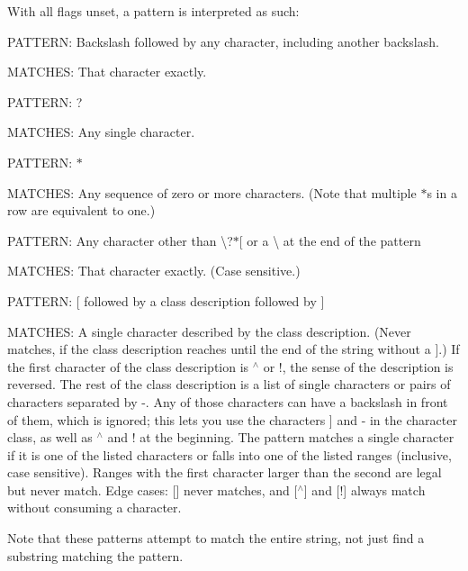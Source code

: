 With all flags unset, a pattern is interpreted as such\-:

P\-A\-T\-T\-E\-R\-N\-: Backslash followed by any character, including another backslash.\par
 M\-A\-T\-C\-H\-E\-S\-: That character exactly.

P\-A\-T\-T\-E\-R\-N\-: ?\par
 M\-A\-T\-C\-H\-E\-S\-: Any single character. 

P\-A\-T\-T\-E\-R\-N\-: $\ast$\par
 M\-A\-T\-C\-H\-E\-S\-: Any sequence of zero or more characters. (Note that multiple $\ast$s in a row are equivalent to one.)

P\-A\-T\-T\-E\-R\-N\-: Any character other than \textbackslash{}?$\ast$\mbox{[} or a \textbackslash{} at the end of the pattern\par
 M\-A\-T\-C\-H\-E\-S\-: That character exactly. (Case sensitive.)

P\-A\-T\-T\-E\-R\-N\-: \mbox{[} followed by a class description followed by \mbox{]}\par
 M\-A\-T\-C\-H\-E\-S\-: A single character described by the class description. (Never matches, if the class description reaches until the end of the string without a \mbox{]}.) If the first character of the class description is $^\wedge$ or !, the sense of the description is reversed. The rest of the class description is a list of single characters or pairs of characters separated by -\/. Any of those characters can have a backslash in front of them, which is ignored; this lets you use the characters \mbox{]} and -\/ in the character class, as well as $^\wedge$ and ! at the beginning. The pattern matches a single character if it is one of the listed characters or falls into one of the listed ranges (inclusive, case sensitive). Ranges with the first character larger than the second are legal but never match. Edge cases\-: \mbox{[}\mbox{]} never matches, and \mbox{[}$^\wedge$\mbox{]} and \mbox{[}!\mbox{]} always match without consuming a character.

Note that these patterns attempt to match the entire string, not just find a substring matching the pattern.


